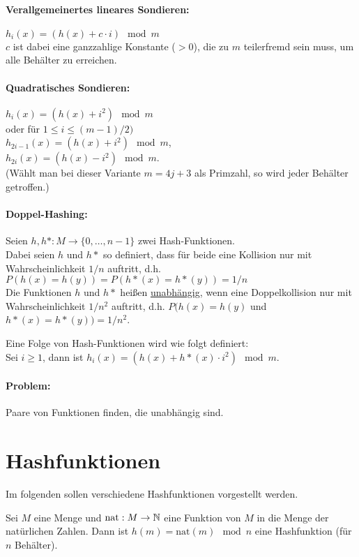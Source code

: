 \paragraph{Verallgemeinertes lineares Sondieren:} $h_i(x) = (h(x) + c \cdot i) \mod m$\\
$c$ ist dabei eine ganzzahlige Konstante ($>0$), die zu $m$ teilerfremd sein muss, um alle Behälter zu erreichen.

\paragraph{Quadratisches Sondieren:} $h_i(x) = (h(x) + i^2) \mod m$\\
oder für $1 \le i \le (m − 1)/2)$\\
$h_{2i−1}(x) = (h(x) + i^2) \mod m$,\\
$h_{2i}(x) = (h(x) − i^2) \mod m$.\\
(Wählt man bei dieser Variante $m = 4j + 3$ als Primzahl, so wird jeder Behälter getroffen.)

\paragraph{Doppel-Hashing:} Seien $h, h*
: M \to \{0, \ldots, n−1\}$ zwei Hash-Funktionen.\\
Dabei seien $h$ und $h*$ so definiert, dass für beide eine Kollision nur mit Wahrscheinlichkeit $1/n$ auftritt, d.h. $P(h(x) = h(y)) = P(h*(x) = h*(y)) = 1/n$\\
Die Funktionen $h$ und $h*$ heißen \ul{unabhängig}, wenn eine Doppelkollision nur mit Wahrscheinlichkeit $1/n^2$ auftritt, d.h. $P(h(x) = h(y)$ und $h*(x) = h* (y)) = 1/n^2$.

Eine Folge von Hash-Funktionen wird wie folgt definiert:\\
Sei $i \ge 1$, dann ist $h_i(x) = (h(x) + h*(x) \cdot i^2) \mod m$.

\paragraph{Problem:} Paare von Funktionen finden, die unabhängig sind.

\section{Hashfunktionen}
Im folgenden sollen verschiedene Hashfunktionen vorgestellt werden.

Sei $M$ eine Menge und $\text{nat} : M \to \mathbb{N}$ eine Funktion von $M$ in die Menge der natürlichen Zahlen. Dann ist $h(m) = \text{nat}(m) \mod n$ eine Hashfunktion (für $n$ Behälter).

